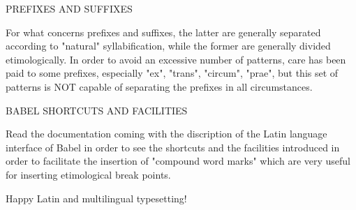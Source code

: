  

                           PREFIXES AND SUFFIXES

For what concerns prefixes and suffixes, the latter are generally  separated
according  to  "natural"  syllabification,  while  the  former are generally
divided etimologically. In order to  avoid  an excessive number of patterns,
care has been paid to some prefixes,  especially  "ex",  "trans",  "circum",
"prae",  but  this set of patterns is NOT capable of separating the prefixes
in all circumstances.

                        BABEL SHORTCUTS AND FACILITIES

Read  the  documentation  coming  with the discription of the Latin language
interface of  Babel  in  order  to  see  the  shortcuts  and  the facilities
introduced in order to facilitate the insertion  of  "compound  word  marks"
which are very useful for inserting etimological break points.

Happy Latin and multilingual typesetting!
